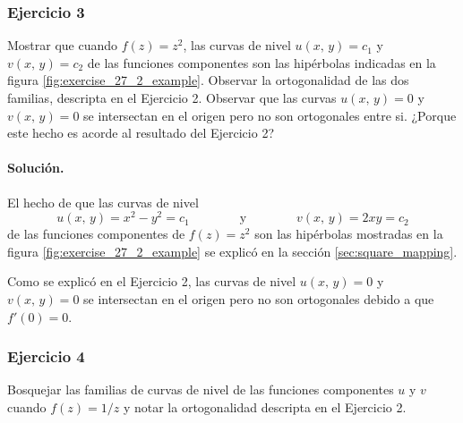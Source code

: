 \documentclass[a4paper]{report}
\begin{document}
\subsubsection{Ejercicio 3}

Mostrar que cuando \(f(z)=z^2\), las curvas de nivel \(u(x,\,y)=c_1\) y \(v(x,\,y)=c_2\) de las funciones componentes son las hipérbolas indicadas en la figura \ref{fig:exercise_27_2_example}. Observar la ortogonalidad de las dos familias, descripta en el Ejercicio 2. Observar que las curvas \(u(x,\,y)=0\) y \(v(x,\,y)=0\) se intersectan en el origen pero no son ortogonales entre si. ¿Porque este hecho es acorde al resultado del Ejercicio 2? 

\paragraph{Solución.} El hecho de que las curvas de nivel 
\[
 u(x,\,y)=x^2-y^2=c_1
 \qquad\qquad\textrm{y}\qquad\qquad
 v(x,\,y)=2xy=c_2
\]
de las funciones componentes de \(f(z)=z^2\) son las hipérbolas mostradas en la figura \ref{fig:exercise_27_2_example} se explicó en la sección \ref{sec:square_mapping}.

Como se explicó en el Ejercicio 2, las curvas de nivel \(u(x,\,y)=0\) y \(v(x,\,y)=0\) se intersectan en el origen pero no son ortogonales debido a que \(f'(0)=0\).

\subsubsection{Ejercicio 4}

Bosquejar las familias de curvas de nivel de las funciones componentes \(u\) y \(v\) cuando \(f(z)=1/z\) y notar la ortogonalidad descripta en el Ejercicio 2.
\end{document}

